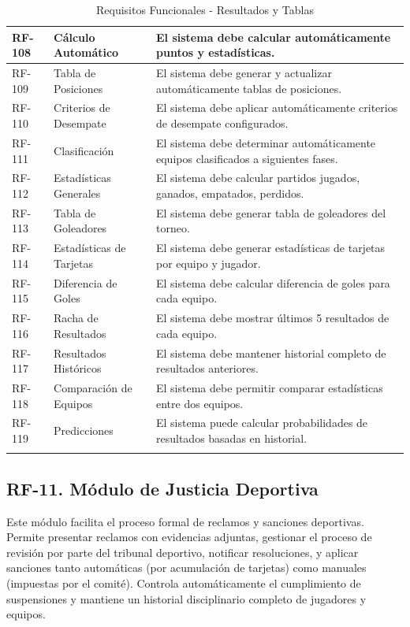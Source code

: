 \documentclass[12pt,a4paper]{article}
\begin{document}
\begin{longtable}{|>{\centering\arraybackslash}p{1.5cm}|>{\raggedright\arraybackslash}p{3.2cm}|>{\raggedright\arraybackslash}p{9cm}|}
RF-108 & Cálculo Automático & El sistema debe calcular automáticamente puntos y estadísticas. \\
\hline
\rowcolor{rowgray}
RF-109 & Tabla de Posiciones & El sistema debe generar y actualizar automáticamente tablas de posiciones. \\
\hline
RF-110 & Criterios de Desempate & El sistema debe aplicar automáticamente criterios de desempate configurados. \\
\hline
\rowcolor{rowgray}
RF-111 & Clasificación & El sistema debe determinar automáticamente equipos clasificados a siguientes fases. \\
\hline
RF-112 & Estadísticas Generales & El sistema debe calcular partidos jugados, ganados, empatados, perdidos. \\
\hline
\rowcolor{rowgray}
RF-113 & Tabla de Goleadores & El sistema debe generar tabla de goleadores del torneo. \\
\hline
RF-114 & Estadísticas de Tarjetas & El sistema debe generar estadísticas de tarjetas por equipo y jugador. \\
\hline
\rowcolor{rowgray}
RF-115 & Diferencia de Goles & El sistema debe calcular diferencia de goles para cada equipo. \\
\hline
RF-116 & Racha de Resultados & El sistema debe mostrar últimos 5 resultados de cada equipo. \\
\hline
\rowcolor{rowgray}
RF-117 & Resultados Históricos & El sistema debe mantener historial completo de resultados anteriores. \\
\hline
RF-118 & Comparación de Equipos & El sistema debe permitir comparar estadísticas entre dos equipos. \\
\hline
\rowcolor{rowgray}
RF-119 & Predicciones & El sistema puede calcular probabilidades de resultados basadas en historial. \\
\hline
\caption{Requisitos Funcionales - Resultados y Tablas}
\end{longtable}

\subsection{RF-11. Módulo de Justicia Deportiva}

Este módulo facilita el proceso formal de reclamos y sanciones deportivas. Permite presentar reclamos con evidencias adjuntas, gestionar el proceso de revisión por parte del tribunal deportivo, notificar resoluciones, y aplicar sanciones tanto automáticas (por acumulación de tarjetas) como manuales (impuestas por el comité). Controla automáticamente el cumplimiento de suspensiones y mantiene un historial disciplinario completo de jugadores y equipos.
\end{document}
